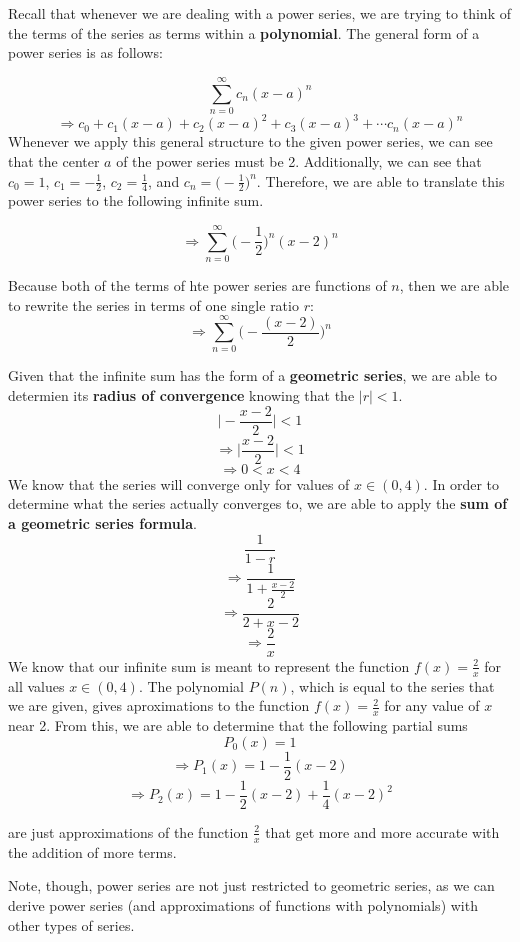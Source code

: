 Recall that whenever we are dealing with a power series,
we are trying to think of the terms of the series as
terms within a \textbf{polynomial}. The general form of a
power series is as follows:

\[ \sum_{n=0}^{\infty} c_{n}(x-a)^{n} \]
\[\Rightarrow c_{0} + c_{1}(x-a) + c_{2}(x-a)^{2} +
  c_{3}(x-a)^{3} + \cdots c_{n}(x-a)^{n}\]
Whenever we apply this general structure to the
given power series, we can see that the center $ a $ of the
power series must be 2. Additionally, we can see that
$ c_{0} = 1 $, $c_{1} = - \frac{1}{2}$, $c_{2} = \frac{1}{4}$,
and $ c_{n} = \Biggr( - \frac{1}{2}\Biggr)^{n}$.
Therefore, we are able to translate this power series
to the following infinite sum.

\[ \Rightarrow \sum_{n=0}^{\infty} \Biggr( - \frac{1}{2}  \Biggr)^{n} (x-2)^{n} \]

Because both of the terms of hte power series are
functions of $ n $, then we are able to rewrite the series
in terms of one single ratio $ r$:
\[ \Rightarrow \sum_{n=0}^{\infty} \Biggr( - \frac{(x-2)}{2}  \Biggr)^{n }\]

Given that the infinite sum has the form of a
\textbf{geometric series}, we are able to determien its
\textbf{radius of convergence} knowing that the $ |r| < 1 $.
\[ \Biggr| - \frac{x-2}{2}  \Biggr| < 1 \]
\[ \Rightarrow \Biggr| \frac{x-2}{2}  \Biggr| < 1 \]
\[ \Rightarrow 0 < x < 4 \]
We know that the series will converge only for values of
$ x \in (0,4)$. In order to determine what the series
actually converges to, we are able to apply the
\textbf{sum of a geometric series formula}.
\[ \frac{1}{1-r}\]
\[ \Rightarrow \frac{1}{1+\frac{x-2}{2}}\]
\[ \Rightarrow \frac{2}{2 + x - 2 }\]
\[ \Rightarrow \frac{2}{x}\]
We know that our infinite sum is meant to represent the
function $ f(x) = \frac{2}{x}$ for all values $ x \in (0, 4)$.
The polynomial $ P(n) $, which is equal to the series that
we are given, gives aproximations to the function $ f(x) = \frac{2}{x}$ for any value of $ x $ near 2. From this, we
are able to determine that the following partial sums
\[ P_{0}(x) = 1\]
\[ \Rightarrow  P_{1}(x) = 1 - \frac{1}{2}(x-2)\]
\[ \Rightarrow P_{2}(x) = 1 - \frac{1}{2}(x-2) +
  \frac{1}{4}(x-2)^{2} \]

are just approximations of the function $ \frac{2}{x}$  that
get more and more accurate with the addition of more terms.

Note, though, power series are not just restricted to
geometric series, as we can derive power series (and
approximations of functions with polynomials) with
other types of series.

